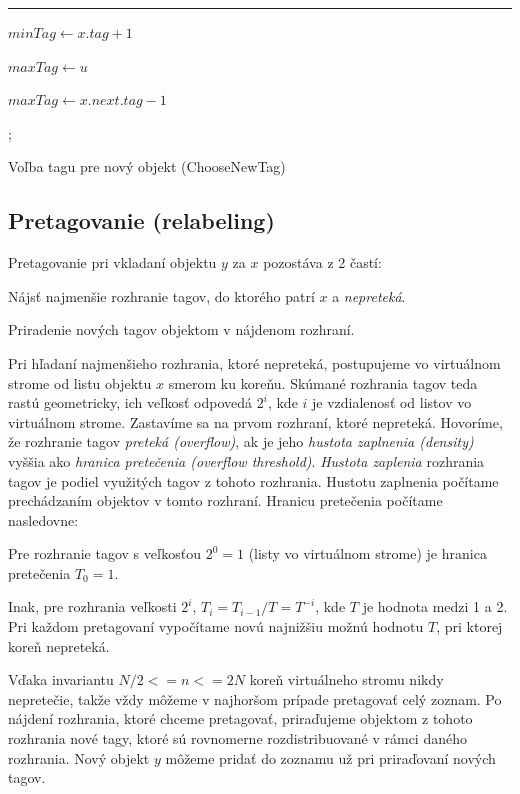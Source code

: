 \documentclass[
  digital,     %
  oneside,     %
  nosansbold,  %
  nocolorbold, %
  lof,         %
  lot,         %
]{fithesis4}
\begin{document}
\begin{algorithm}
\hrule\vspace{0.2em}
$minTag \leftarrow x.tag + 1$\;

$maxTag \leftarrow u$\;

{
    $maxTag \leftarrow x.next.tag - 1$\;
}

; 
\caption{Voľba tagu pre nový objekt (ChooseNewTag) }
\end{algorithm}

\subsection{Pretagovanie (relabeling)}
Pretagovanie pri vkladaní objektu $y$ za $x$ pozostáva z 2 častí:
\begin{compactenum}
    \item Nájsť najmenšie rozhranie tagov, do ktorého patrí $x$ a \textit{nepreteká}.
    \item Priradenie nových tagov objektom v nájdenom rozhraní.
\end{compactenum}
Pri hľadaní najmenšieho rozhrania, ktoré nepreteká, postupujeme vo virtuálnom strome od listu objektu $x$ smerom ku koreňu. Skúmané rozhrania tagov teda rastú geometricky, ich veľkosť odpovedá $2^i$, kde $i$ je vzdialenosť od listov vo virtuálnom strome. Zastavíme sa na prvom rozhraní, ktoré nepreteká.
Hovoríme, že rozhranie tagov \textit{preteká (overflow)}, ak je jeho \textit{hustota zaplnenia (density)} vyššia ako \textit{hranica pretečenia (overflow threshold)}. \textit{Hustota zaplenia} rozhrania tagov je podiel využitých tagov z tohoto rozhrania. Hustotu zaplnenia počítame prechádzaním objektov v tomto rozhraní. Hranicu pretečenia počítame nasledovne:
\begin{compactenum}
    \item Pre rozhranie tagov s veľkosťou $2^0 = 1$ (listy vo virtuálnom strome) je hranica pretečenia $T_0 = 1$.
    \item Inak, pre rozhrania veľkosti $2^i$, $T_i = T_{i-1} / T = T^{-i}$, kde $T$ je hodnota medzi 1 a 2. Pri každom pretagovaní vypočítame novú najnižšiu možnú hodnotu $T$, pri ktorej koreň nepreteká.
\end{compactenum}
Vďaka invariantu $N/2 <= n <= 2N$ koreň virtuálneho stromu nikdy nepretečie, takže vždy môžeme v najhoršom prípade pretagovať celý zoznam.
Po nájdení rozhrania, ktoré chceme pretagovať, priraďujeme objektom z tohoto rozhrania nové tagy, ktoré sú rovnomerne rozdistribuované v rámci daného rozhrania. Nový objekt $y$ môžeme pridať do zoznamu už pri priraďovaní nových tagov.
\end{document}
